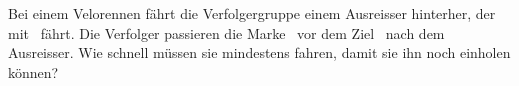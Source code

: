 Bei einem Velorennen fährt die Verfolgergruppe einem Ausreisser hinterher, der mit \vAuO\ fährt. Die Verfolger passieren die Marke \sVO\ vor dem Ziel \tVO\ nach dem Ausreisser. Wie schnell müssen sie mindestens fahren, damit sie ihn noch einholen können?
